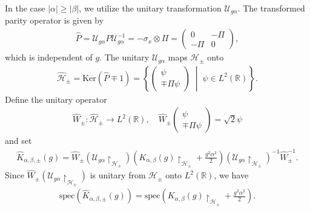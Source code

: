 \documentclass[12pt,dvipdfmx]{article}
\newcommand{\RR}{\mathbb{R}}
\newcommand{\cH}{\mathcal{H}}
\newcommand{\Ker}{\mathrm{Ker}}
\newcommand{\spec}{\mathrm{spec}}
\begin{document}
In the case $|\alpha|\ge|\beta|$, we utilize the unitary transformation $\mathcal{U} _{g\alpha}$. The transformed parity operator is given by
    \begin{align*}
    \hat{P}
    =
    \mathcal{U} _{g\alpha} P \mathcal{U} _{g\alpha}^{-1}
    =
    -\sigma_x \otimes \Pi
    =
    \begin{pmatrix} 0 & -\Pi\\ -\Pi & 0 \end{pmatrix},
\end{align*}
which is independent of $g$. The unitary $\mathcal{U} _{g\alpha}$ maps $\cH _\pm$ onto
\begin{align*}
    \hat{\cH} _\pm
    =
    \Ker(\hat{P} \mp 1)
    =
    \left\{
        \begin{pmatrix} \psi\\ \mp\Pi\psi \end{pmatrix}
        \;\middle|\;
        \psi \in L^2(\RR)
    \right\}.
\end{align*}
Define the unitary operator
\begin{align*}
    \hat{W}_\pm: \hat{\cH} _\pm \longrightarrow L^2(\RR),
    \quad
    \hat{W}_\pm \begin{pmatrix} \psi\\ \mp\Pi\psi \end{pmatrix}
    =
    \sqrt2\psi
\end{align*}
and set
\begin{align*}
    \hat{K}_{\alpha,\beta,\pm}(g)
=
    \hat{W}_\pm
    \left(
        \mathcal{U} _{g\alpha} \upharpoonright_{\cH_\pm}
    \right)
    \left(
        K_{\alpha,\beta}(g)\upharpoonright_{\cH_\pm}
        +
        \frac{g^2\alpha^2}{2}
    \right)
    \left(
        \mathcal{U} _{g\alpha} \upharpoonright_{\cH_\pm}
    \right)^{-1}
    \hat{W}_\pm^{-1}.
\end{align*}
Since
$
    \hat{W}_\pm
    \left(
        \mathcal{U} _{g\alpha} \upharpoonright_{\cH_\pm}
    \right)
$
is unitary from $\cH_\pm$ onto $L^2(\RR)$, we have
\begin{align*}
    \spec\left(\hat{K}_{\alpha,\beta,\pm}(g)\right)
    =
    \spec
    \left(
        K_{\alpha,\beta}(g)\upharpoonright_{\cH_\pm}
        +
        \frac{g^2\alpha^2}{2}
    \right).
\end{align*}
\end{document}
